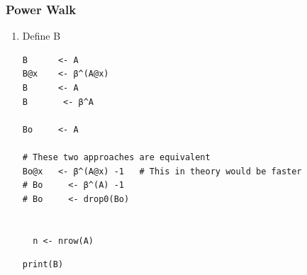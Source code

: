 \documentclass[11pt]{article}
\begin{document}
\subsubsection{Power Walk}
\label{sec:org0a9b93b}
\begin{enumerate}
\item Define B
\label{sec:org3c77166}
\lstset{language=r,label= ,caption= ,captionpos=b,numbers=none}
\begin{lstlisting}
B      <- A
B@x    <- β^(A@x)
B      <- A
B       <- β^A

Bo     <- A

# These two approaches are equivalent
Bo@x   <- β^(A@x) -1   # This in theory would be faster
# Bo     <- β^(A) -1
# Bo     <- drop0(Bo)


  n <- nrow(A)
\end{lstlisting}

\lstset{language=r,label= ,caption= ,captionpos=b,numbers=none}
\begin{lstlisting}
print(B)
\end{lstlisting}


\end{enumerate}
\end{document}
